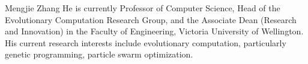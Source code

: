 \documentclass[10pt,journal,compsoc]{IEEEtran}
\begin{document}
\vspace{-9.5 mm}
\begin{IEEEbiography}{Mengjie Zhang}
He is currently Professor of
Computer Science, Head of the Evolutionary Computation Research Group, and the Associate Dean
(Research  and  Innovation)  in  the  Faculty  of  Engineering, Victoria University of Wellington. His current research interests include evolutionary computation,
particularly genetic programming, particle swarm optimization.
\end{IEEEbiography}
\end{document}
